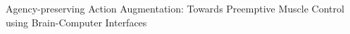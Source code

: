 









Agency-preserving Action Augmentation: Towards Preemptive Muscle Control using Brain-Computer Interfaces


